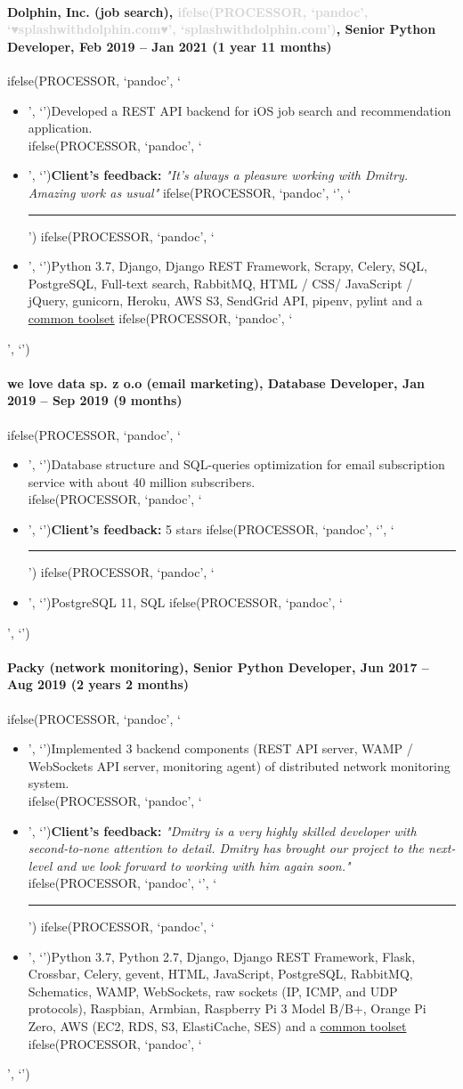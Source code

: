 \documentclass[a4paper,8pt]{extarticle}
\newcommand{\chrule}{ifelse(PROCESSOR, `pandoc', `', `\vspace{3pt}\hrule')}
\newcommand{\brokenhreflg}[1]{\textcolor{lightgray}{ifelse(PROCESSOR, `pandoc', `♥#1♥', `#1')}}
\newcommand{\pdbeginitemize}{ifelse(PROCESSOR, `pandoc', `\begin{itemize}', `')}
\newcommand{\pditem}{ifelse(PROCESSOR, `pandoc', `\item', `')}
\newcommand{\pdenditemize}{ifelse(PROCESSOR, `pandoc', `\end{itemize}', `')}
\begin{document}
\paragraph*{Dolphin, Inc. (job search), \brokenhreflg{splashwithdolphin.com}, Senior Python Developer, Feb 2019 -- Jan 2021 (1 year 11 months)}
\pdbeginitemize
\pditem Developed a REST API backend for iOS job search and recommendation application.\\
\pditem \textbf{Client's feedback:} \textit{"It's always a pleasure working with Dmitry. Amazing work as usual"}
\chrule
\pditem Python 3.7, Django, Django REST Framework, Scrapy, Celery, SQL, PostgreSQL, Full-text search, RabbitMQ, HTML / CSS/ JavaScript / jQuery, gunicorn, Heroku, AWS S3, SendGrid API, pipenv, pylint and a \hyperlink{common-toolset}{common toolset}
\pdenditemize

\paragraph*{we love data sp. z o.o (email marketing), Database Developer, Jan 2019 -- Sep 2019 (9 months)}
\pdbeginitemize
\pditem Database structure and SQL-queries optimization for email subscription service with about 40 million subscribers.\\
\pditem \textbf{Client's feedback:} 5 stars
\chrule
\pditem PostgreSQL 11, SQL
\pdenditemize

\paragraph*{Packy (network monitoring), \textbf{Senior Python Developer}, Jun 2017 -- Aug 2019 (2 years 2 months)}
\pdbeginitemize
\pditem Implemented 3 backend components (REST API server, WAMP / WebSockets API server, monitoring agent) of distributed network monitoring system.\\
\pditem \textbf{Client's feedback:} \textit{"Dmitry is a very highly skilled developer with second-to-none attention to detail. Dmitry has brought our project to the next-level and we look forward to working with him again soon."}
\chrule
\pditem Python 3.7, Python 2.7, Django, Django REST Framework, Flask, Crossbar, Celery, gevent, HTML, JavaScript, PostgreSQL, RabbitMQ, Schematics, WAMP, WebSockets, raw sockets (IP, ICMP, and UDP protocols), Raspbian, Armbian, Raspberry Pi 3 Model B/B+, Orange Pi Zero, AWS (EC2, RDS, S3, ElastiCache, SES) and a \hyperlink{common-toolset}{common toolset}
\pdenditemize
\end{document}
